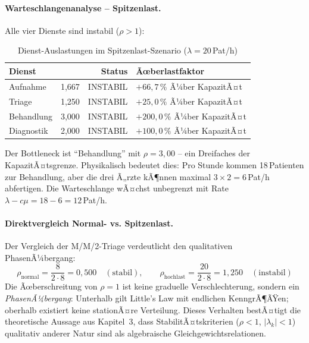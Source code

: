 ﻿\documentclass[a4paper,12pt]{scrreprt}
\theoremstyle{definition}
\begin{document}
\paragraph{Warteschlangenanalyse -- Spitzenlast.}
Alle vier Dienste sind instabil ($\rho > 1$):

\begin{table}[H]
	\centering
	\begin{tabular}{@{}lrrl@{}}
		\toprule
		\textbf{Dienst} & \boldmath{$\rho$} & \textbf{Status} & \textbf{Ãœberlastfaktor} \\
		\midrule
		Aufnahme   & 1{,}667 & INSTABIL & $+66{,}7\,\%$ Ã¼ber KapazitÃ¤t \\
		Triage     & 1{,}250 & INSTABIL & $+25{,}0\,\%$ Ã¼ber KapazitÃ¤t \\
		Behandlung & 3{,}000 & INSTABIL & $+200{,}0\,\%$ Ã¼ber KapazitÃ¤t \\
		Diagnostik & 2{,}000 & INSTABIL & $+100{,}0\,\%$ Ã¼ber KapazitÃ¤t \\
		\bottomrule
	\end{tabular}
	\caption{Dienst-Auslastungen im Spitzenlast-Szenario ($\lambda = 20$\,Pat/h)}
	\label{tab:auslastung-hochlast}
\end{table}

Der Bottleneck ist ``Behandlung'' mit $\rho = 3{,}00$ -- ein Dreifaches
der KapazitÃ¤tsgrenze. Physikalisch bedeutet dies: Pro Stunde kommen
18\,Patienten zur Behandlung, aber die drei Ã„rzte kÃ¶nnen maximal
$3 \times 2 = 6$\,Pat/h abfertigen. Die Warteschlange wÃ¤chst
unbegrenzt mit Rate $\lambda - c\mu = 18 - 6 = 12$\,Pat/h.

\paragraph{Direktvergleich Normal- vs. Spitzenlast.}
Der Vergleich der M/M/2-Triage verdeutlicht den qualitativen PhasenÃ¼bergang:
\begin{equation}
	\rho_\text{normal} = \frac{8}{2 \cdot 8} = 0{,}500 \quad (\text{stabil}),
	\qquad
	\rho_\text{hochlast} = \frac{20}{2 \cdot 8} = 1{,}250 \quad (\text{instabil})
\end{equation}
Die Ãœberschreitung von $\rho = 1$ ist keine graduelle Verschlechterung,
sondern ein \emph{PhasenÃ¼bergang}: Unterhalb gilt Little's Law
mit endlichen KenngrÃ¶ÃŸen; oberhalb existiert keine stationÃ¤re Verteilung.
Dieses Verhalten bestÃ¤tigt die theoretische Aussage aus Kapitel~3, dass
StabilitÃ¤tskriterien ($\rho < 1$, $|\lambda_k| < 1$) qualitativ anderer
Natur sind als algebraische Gleichgewichtsrelationen.
\end{document}
